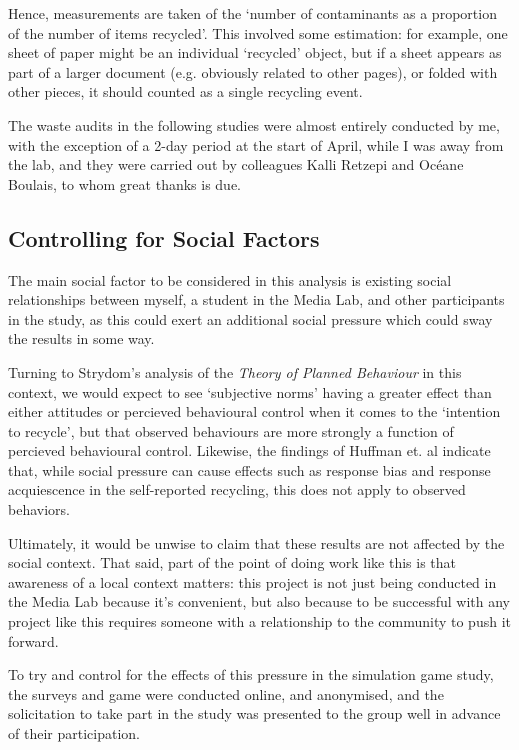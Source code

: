 \documentclass[nofonts,nols,justified,nobib]{tufte-book}
\begin{document}
Hence, measurements are taken of the ‘number of contaminants as a proportion of the number of items recycled’. This involved some estimation: for example, one sheet of paper might be an individual ‘recycled’ object, but if a sheet appears as part of a larger document (e.g. obviously related to other pages), or folded with other pieces, it should counted as a single recycling event. 

The waste audits in the following studies were almost entirely conducted by me, with the exception of a 2-day period at the start of April, while I was away from the lab, and they were carried out by colleagues Kalli Retzepi and Oc\'eane Boulais, to whom great thanks is due.

\subsection*{Controlling for Social Factors}
The main social factor to be considered in this analysis is existing social relationships between myself, a student in the Media Lab, and other participants in the study, as this could exert an additional social pressure which could sway the results in some way.

Turning to Strydom's analysis of the \emph{Theory of Planned Behaviour} in this context, we would expect to see `subjective norms' having a greater effect than either attitudes or percieved behavioural control when it comes to the `intention to recycle', but that observed behaviours are more strongly a function of percieved behavioural control. Likewise, the findings of Huffman et. al indicate that, while social pressure can cause effects such as response bias and response acquiescence in the self-reported recycling, this does not apply to observed behaviors. 

Ultimately, it would be unwise to claim that these results are not affected by the social context. That said, part of the point of doing work like this is that awareness of a local context matters: this project is not just being conducted in the Media Lab because it’s convenient, but also because to be successful with any project like this requires someone with a relationship to the community to push it forward.

To try and control for the effects of this pressure in the simulation game study, the surveys and game were conducted online, and anonymised, and the solicitation to take part in the study was presented to the group well in advance of their participation.
\end{document}
